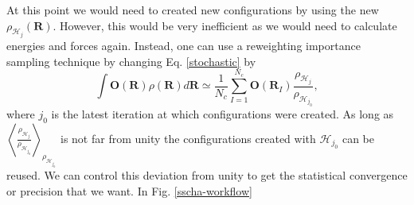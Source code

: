 At this point we would need to created new configurations by using the new $\rho_{\mathcal{H}_{j}}(\mathbf{R})$. However, this would be very inefficient as we would need to calculate energies and forces again. 
Instead, one can use a reweighting  importance sampling technique by changing Eq. \ref{stochastic} by
\begin{equation}
 \int{\mathbf{O}(\mathbf{R})\rho(\mathbf{R})d\mathbf{R}}\simeq\frac{1}{N_{c}}\sum_{I=1}^{N_{c}}\mathbf{O}(\mathbf{R}_{I})\frac{\rho_{\mathcal{H}_{j}}}{\rho_{\mathcal{H}_{j_{0}}}},
\end{equation} 
where $j_{0}$ is the latest iteration at which configurations were created. As long as $\left\langle\frac{\rho_{\mathcal{H}_{j}}}{\rho_{\mathcal{H}_{j_{0}}}}\right\rangle_{\rho_{\mathcal{H}_{j_{0}}}}$ is not 
far from unity the configurations created with $\mathcal{H}_{j_{0}}$ can be reused. We can control this deviation from unity to get the statistical convergence or precision that we want. In 
Fig. \ref{sscha-workflow}
